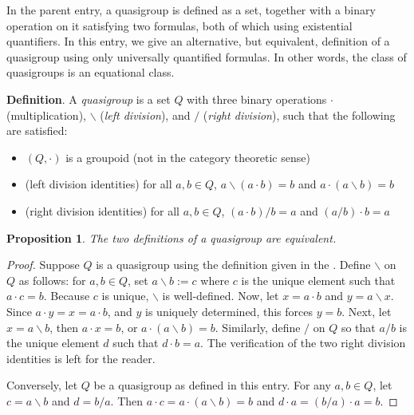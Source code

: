 \documentclass[12pt]{article}
\newtheorem{prop}{Proposition}
\begin{document}
In the parent entry, a quasigroup is defined as a set, together with a binary operation on it satisfying two formulas, both of which using existential quantifiers.  In this entry, we give an alternative, but equivalent, definition of a quasigroup using only universally quantified formulas.  In other words, the class of quasigroups is an equational class.

\textbf{Definition}.  A \emph{quasigroup} is a set $Q$ with three binary operations $\cdot$ (multiplication), $\backslash$ (\emph{left division}), and $/$ (\emph{right division}), such that the following are satisfied:
\begin{itemize}
\item $(Q,\cdot)$ is a groupoid (not in the category theoretic sense)
\item (left division identities) for all $a,b\in Q$, $a \backslash (a \cdot b)=b$ and $a\cdot (a \backslash b) = b$
\item (right division identities) for all $a,b\in Q$, $(a \cdot b)/ b=a$ and $(a/b) \cdot b = a$
\end{itemize}

\begin{prop} The two definitions of a quasigroup are equivalent. \end{prop}
\begin{proof}
Suppose $Q$ is a quasigroup using the definition given in the .  Define $\backslash$ on $Q$ as follows: for $a,b\in Q$, set $a\backslash b:=c$ where $c$ is the unique element such that $a\cdot c = b$.  Because $c$ is unique, $\backslash$ is well-defined.  Now, let $x = a\cdot b$ and $y = a\backslash x$.  Since $a\cdot y = x = a \cdot b$, and $y$ is uniquely determined, this forces $y=b$.  Next, let $x=a\backslash b$, then $a \cdot x =b$, or $a \cdot (a\backslash b) = b$.  Similarly, define $/$ on $Q$ so that $a/b$ is the unique element $d$ such that $d\cdot b=a$.  The verification of the two right division identities is left for the reader.

Conversely, let $Q$ be a quasigroup as defined in this entry.  For any $a,b\in Q$, let $c=a\backslash b$ and $d=b/a$.  Then $a \cdot c = a \cdot (a \backslash b) = b$ and $d \cdot a = (b/a) \cdot a = b$.
\end{proof}
\end{document}
